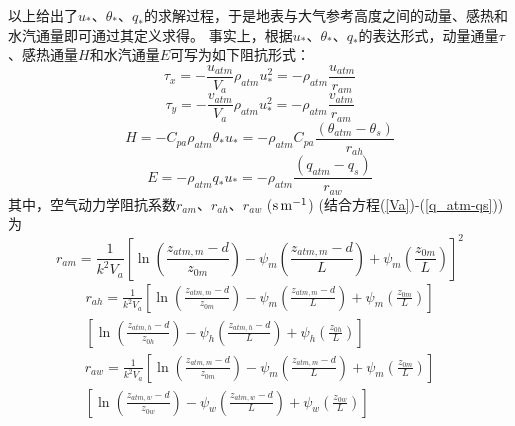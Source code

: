 以上给出了$u_\ast$、$\theta_\ast$、$q_\ast$的求解过程，于是地表与大气参考高度之间的动量、感热和水汽通量即可通过其定义求得。
事实上，根据$u_\ast$、$\theta_\ast$、$q_\ast$的表达形式，动量通量$\tau$、感热通量$H$和水汽通量$E$可写为如下阻抗形式：
\begin{equation}
\tau_{x}=-\frac{u_{atm}}{V_{a}} \rho_{atm} u_{*}^{2}=-\rho_{atm} \frac{u_{atm}}{r_{a m}}
\end{equation}
\begin{equation}
\tau_{y}=-\frac{v_{atm}}{V_{a}} \rho_{atm} u_{*}^{2}=-\rho_{atm} \frac{v_{atm}}{r_{a m}}
\end{equation}
\begin{equation}
H=-C_{p a} \rho_{atm} \theta_{*} u_{*}=-\rho_{atm} C_{p a} \frac{\left(\theta_{atm}-\theta_{s}\right)}{r_{a h}}
\end{equation}
\begin{equation}
E=-\rho_{atm} q_{*} u_{*}=-\rho_{atm} \frac{\left(q_{atm}-q_{s}\right)}{r_{a w}}
\end{equation}
其中，空气动力学阻抗系数$r_{am}$、$r_{ah}$、$r_{aw}$ ($\rm s\,m^{-1}$) (结合方程(\ref{Va})-(\ref{q_atm-qs}))为
\begin{equation}\label{ram}
r_{a m}=\frac{1}{k^{2} V_{a}}\left[\ln \left(\frac{z_{atm, m}-d}{z_{0 m}}\right)-\psi_{m}\left(\frac{z_{atm, m}-d}{L}\right)+\psi_{m}\left(\frac{z_{0 m}}{L}\right)\right]^{2}
\end{equation}
\begin{equation}\label{rah}
\begin{array}{c}r_{a h}=\frac{1}{k^{2} V_{a}}\left[\ln \left(\frac{z_{atm, m}-d}{z_{0 m}}\right)-\psi_{m}\left(\frac{z_{atm, m}-d}{L}\right)+\psi_{m}\left(\frac{z_{0 m}}{L}\right)\right] \\ {\left[\ln \left(\frac{z_{atm, h}-d}{z_{0 h}}\right)-\psi_{h}\left(\frac{z_{atm, h}-d}{L}\right)+\psi_{h}\left(\frac{z_{0 h}}{L}\right)\right]}\end{array}
\end{equation}
\begin{equation}\label{raw}
\begin{array}{c}r_{a w}=\frac{1}{k^{2} V_{a}}\left[\ln \left(\frac{z_{atm, m}-d}{z_{0 m}}\right)-\psi_{m}\left(\frac{z_{atm, m}-d}{L}\right)+\psi_{m}\left(\frac{z_{0 m}}{L}\right)\right] \\ {\left[\ln \left(\frac{z_{atm, w}-d}{z_{0 w}}\right)-\psi_{w}\left(\frac{z_{atm, w}-d}{L}\right)+\psi_{w}\left(\frac{z_{0 w}}{L}\right)\right]}\end{array}
\end{equation}

